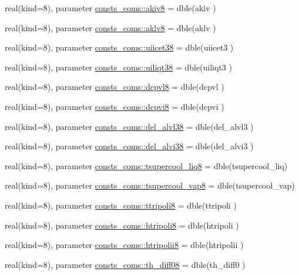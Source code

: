 \begin{DoxyCompactItemize}
real(kind=8), parameter \hyperlink{namespaceconsts__coms_a6a7209c2fd5f7e59d9dac0d61368fe74}{consts\+\_\+coms\+::akiv8} = dble(akiv )
\item 
real(kind=8), parameter \hyperlink{namespaceconsts__coms_a03b5f451f4332f706d323b3de82210d9}{consts\+\_\+coms\+::aklv8} = dble(aklv )
\item 
real(kind=8), parameter \hyperlink{namespaceconsts__coms_a93bb3f6b23cdf15d90094bd2ba30ad8a}{consts\+\_\+coms\+::uiicet38} = dble(uiicet3 )
\item 
real(kind=8), parameter \hyperlink{namespaceconsts__coms_a171bd610659557729762f52743c3af83}{consts\+\_\+coms\+::uiliqt38} = dble(uiliqt3 )
\item 
real(kind=8), parameter \hyperlink{namespaceconsts__coms_a4ec7b613e368deeeb7c1078b5d2f4cf1}{consts\+\_\+coms\+::dcpvl8} = dble(dcpvl )
\item 
real(kind=8), parameter \hyperlink{namespaceconsts__coms_ae6c5bc2e2b10660ff626e4299ea10988}{consts\+\_\+coms\+::dcpvi8} = dble(dcpvi )
\item 
real(kind=8), parameter \hyperlink{namespaceconsts__coms_a00a1e758e0133923e5be7fb331e8480f}{consts\+\_\+coms\+::del\+\_\+alvl38} = dble(del\+\_\+alvl3 )
\item 
real(kind=8), parameter \hyperlink{namespaceconsts__coms_ad9bb4be460a90b291f6e2a771e367880}{consts\+\_\+coms\+::del\+\_\+alvi38} = dble(del\+\_\+alvi3 )
\item 
real(kind=8), parameter \hyperlink{namespaceconsts__coms_a2c9885214fcc467cea34fbde9e860607}{consts\+\_\+coms\+::tsupercool\+\_\+liq8} = dble(tsupercool\+\_\+liq)
\item 
real(kind=8), parameter \hyperlink{namespaceconsts__coms_a60f7e49887cc212c75e63c51219699f1}{consts\+\_\+coms\+::tsupercool\+\_\+vap8} = dble(tsupercool\+\_\+vap)
\item 
real(kind=8), parameter \hyperlink{namespaceconsts__coms_aa9842c494b90586e7930b5d2a86da71a}{consts\+\_\+coms\+::ttripoli8} = dble(ttripoli )
\item 
real(kind=8), parameter \hyperlink{namespaceconsts__coms_a75f7026b5529f3647a8f5787e0092c85}{consts\+\_\+coms\+::htripoli8} = dble(htripoli )
\item 
real(kind=8), parameter \hyperlink{namespaceconsts__coms_a499d4c550c8f8a5e4f942f7def28d7cf}{consts\+\_\+coms\+::htripolii8} = dble(htripolii )
\item 
real(kind=8), parameter \hyperlink{namespaceconsts__coms_a26baa2bceffd0f1406090d5a3956fecb}{consts\+\_\+coms\+::th\+\_\+diff08} = dble(th\+\_\+diff0 )

\end{DoxyCompactItemize}
